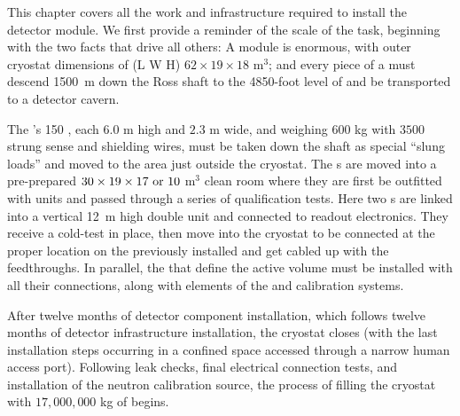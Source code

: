 

This chapter covers all the work and infrastructure required to install the  detector module. 
We first provide a reminder of the scale of the task, beginning with the two facts that drive all others: A   module is enormous, with outer cryostat dimensions  of (L W H) %
$62\times 19\times 18$ m$^{3}$; and every piece of %
a  must descend %
\SI{1500}{m} down the Ross shaft to the 4850-foot level of  and be transported to %
a detector cavern.

The 's %
150 , each $6.0$ m high and $2.3$ m wide, and  weighing $600$ kg with $3500$ strung sense and shielding wires, must be taken down the shaft as special ``slung loads'' and moved to the area just outside the  cryostat. 
The s are moved into a pre-prepared %
$30\times19\times17\ {\rm or}\ 10$ m$^{3}$ clean room
 where they are first be outfitted  with  units and passed through a series of qualification tests.
Here two s are linked into a vertical \SI{12}{m} high double unit and connected to readout electronics. They receive a cold-test in place, then move into the cryostat to be connected at the proper location on the previously installed  and get cabled up with the feedthroughs. 
In parallel, the  that define the  active volume must be installed with all their  connections, along with  elements of the  and calibration systems.

After twelve months of detector component installation, which follows twelve months of detector infrastructure installation, the cryostat closes (with the last installation steps occurring in a confined space accessed through a narrow human access port). 
Following leak checks, final electrical connection tests, and installation of the neutron calibration source, the process of filling the cryostat with $17,000,000$ kg of  begins.

